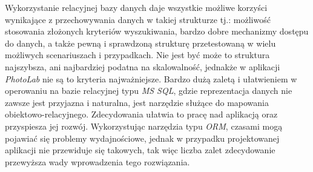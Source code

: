     Wykorzystanie relacyjnej bazy danych daje wszystkie możliwe korzyści wynikające z przechowywania danych w takiej strukturze tj.: możliwość stosowania złożonych kryteriów wyszukiwania, bardzo dobre mechanizmy dostępu do danych, a także pewną i sprawdzoną strukturę przetestowaną w wielu możliwych scenariuszach i przypadkach. Nie jest być może to struktura najszybsza, ani najbardziej podatna na skalowalność, jednakże w aplikacji \textit{PhotoLab} nie są to kryteria najważniejsze. Bardzo dużą zaletą i ułatwieniem w operowaniu na bazie relacyjnej typu \textit{MS SQL}, gdzie reprezentacja danych nie zawsze jest przyjazna i naturalna, jest narzędzie służące do mapowania obiektowo-relacyjnego. Zdecydowania ułatwia to pracę nad aplikacją oraz przyspiesza jej rozwój. Wykorzystując narzędzia typu \textit{ORM}, czasami mogą pojawiać się problemy wydajnościowe, jednak w przypadku projektowanej aplikacji nie przewiduje się takowych, tak więc liczba zalet zdecydowanie przewyższa wady wprowadzenia tego rozwiązania.
    
